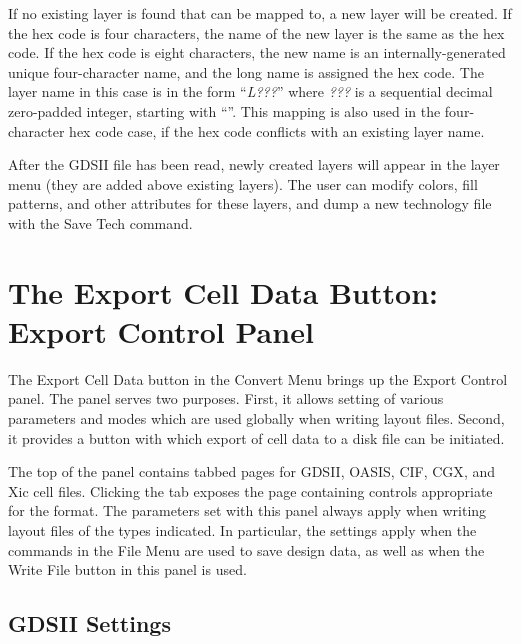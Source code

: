 If no existing layer is found that can be mapped to, a new layer will
be created.  If the hex code is four characters, the name of the new
layer is the same as the hex code.  If the hex code is eight
characters, the new name is an internally-generated unique
four-character name, and the long name is assigned the hex code.  The
layer name in this case is in the form ``{\it L???}'' where {\it ???}
is a sequential decimal zero-padded integer, starting with ``{}''.  This mapping is also used in the four-character hex code
case, if the hex code conflicts with an existing layer name.

After the GDSII file has been read, newly created layers will appear
in the layer menu (they are added above existing layers).  The user
can modify colors, fill patterns, and other attributes for these
layers, and dump a new technology file with the {\cb Save Tech}
command.


\section{The {\cb Export Cell Data} Button: {\cb Export Control} Panel}

The {\cb Export Cell Data} button in the {\cb Convert Menu} brings up
the {\cb Export Control} panel.  The panel serves two purposes. 
First, it allows setting of various parameters and modes which are
used globally when writing layout files.  Second, it provides a button
with which export of cell data to a disk file can be initiated.

The top of the panel contains tabbed pages for {\cb GDSII}, {\cb
OASIS}, {\cb CIF}, {\cb CGX}, and {\cb Xic cell files}.  Clicking the
tab exposes the page containing controls appropriate for the format. 
The parameters set with this panel always apply when writing layout
files of the types indicated.  In particular, the settings apply when
the commands in the {\cb File Menu} are used to save design data, as
well as when the {\cb Write File} button in this panel is used.

\subsection{GDSII Settings}

